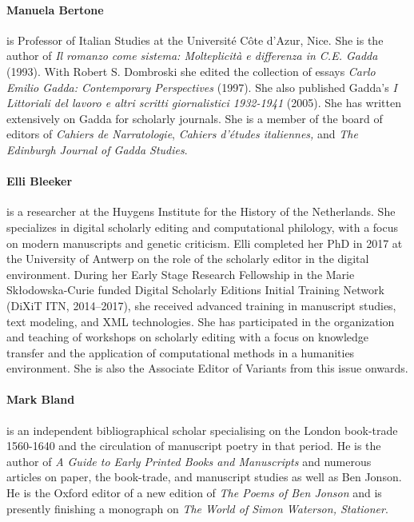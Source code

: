 \paragraph{Manuela Bertone} is Professor of Italian Studies at the
Université Côte d'Azur, Nice. She is the author of \emph{Il romanzo come
sistema: Molteplicità e differenza in C.E. Gadda} (1993). With Robert S.
Dombroski she edited the collection of essays \emph{Carlo Emilio Gadda:
Contemporary Perspectives} (1997). She also published Gadda's \emph{I
Littoriali del lavoro e altri scritti giornalistici 1932-1941} (2005).
She has written extensively on Gadda for scholarly journals. She is a
member of the board of editors of \emph{Cahiers de Narratologie},
\emph{Cahiers d'études italiennes,} and \emph{The Edinburgh Journal of
Gadda Studies}.

\paragraph{Elli Bleeker} is a researcher at the Huygens Institute for the History of the Netherlands. She specializes in digital scholarly editing and computational philology, with a focus on modern manuscripts and genetic criticism. Elli completed her PhD in 2017 at the University of Antwerp on the role of the scholarly editor in the digital environment. During her Early Stage Research Fellowship in the Marie Skłodowska-Curie funded Digital Scholarly Editions Initial Training Network (DiXiT ITN, 2014–2017), she received advanced training in manuscript studies, text modeling, and XML technologies. She has participated in the organization and teaching of workshops on scholarly editing with a focus on knowledge transfer and the application of computational methods in a humanities environment. She is also the Associate Editor of Variants from this issue onwards.

\paragraph{Mark Bland} is an independent bibliographical scholar specialising on the London book-trade 1560-1640 and the circulation of manuscript poetry in that period. He is the author of \textit{A Guide to Early Printed Books and Manuscripts} and numerous articles on paper, the book-trade, and manuscript studies as well as Ben Jonson. He is the Oxford editor of a new edition of \textit{The Poems of Ben Jonson} and is presently finishing a monograph on \textit{The World of Simon Waterson, Stationer}.

